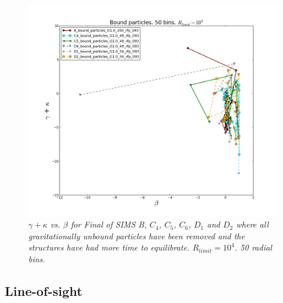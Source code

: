 \begin{figure}[h!]
	\centering
		\includegraphics[width=1.0\linewidth]{img/Attractor_fig5.png}
		{\medskip\caption{\textsl{$\gamma + \kappa$ vs. $\beta$ for Final of SIMS B, 
$C_4$, $C_5$, $C_6$, $D_1$ and $D_2$ where all gravitationally unbound particles have been removed and the structures have had more time to equilibrate. $R_{limit} = 10^4$. 50 radial bins.
\label{fig:Rv}}}}
\end{figure} 

\subsection{Line-of-sight}

